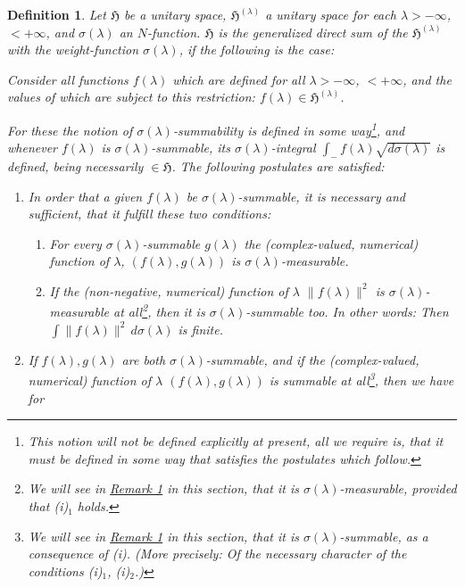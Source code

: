 \documentclass[b5paper,12pt,twoside]{article}
\numberwithin{equation}{section}
\theoremstyle{vnplain}
\theoremstyle{vndefinition}
\newtheorem{definition}{Definition}
\begin{document}
\begin{definition}\label{def:1}
Let $\mathfrak H$ be a unitary space, $\mathfrak H^{(\lambda)}$ a unitary space
for each $\lambda>-\infty$, $<+\infty$, and $\sigma(\lambda)$ an $N$-function.
$\mathfrak H$ is the \emph{generalized direct sum of the
$\mathfrak H^{(\lambda)}$ with the weight-function $\sigma(\lambda)$}, if the
following is the case:

Consider all functions $f(\lambda)$ which are defined for all
$\lambda>-\infty$, $<+\infty$, and the values of which are subject to this
restriction: $f(\lambda)\in\mathfrak H^{(\lambda)}$.

For these the notion of $\sigma(\lambda)$-summability is defined in some
way\footnote{This notion will not be defined explicitly at present, all we
require is, that it must be defined in some way that satisfies the postulates
which follow.}, and whenever $f(\lambda)$ is $\sigma(\lambda)$-summable, its
$\sigma(\lambda)$-integral
$\displaystyle\int_{-}f(\lambda)\sqrt{d\sigma(\lambda)}$ is
defined, being necessarily $\in\mathfrak H$. The following postulates are
satisfied:
\begin{enumerate}[label=(\roman*)]
\item In order that a given $f(\lambda)$ be $\sigma(\lambda)$-summable, it is
necessary and sufficient, that it fulfill these two conditions:
\begin{enumerate}[label=(i)$_{\arabic*}$]
\item For every $\sigma(\lambda)$-summable $g(\lambda)$ the (complex-valued,
numerical) function of $\lambda$, $(f(\lambda),g(\lambda))$ is
$\sigma(\lambda)$-measurable.
\item If the (non-negative, numerical) function of $\lambda$
$\lVert f(\lambda)\rVert^2$ is $\sigma(\lambda)$-measurable at
all\footnote{We will see in \hyperref[rem:3.1]{Remark 1} in this section, that it is
$\sigma(\lambda)$-measurable, provided that (i)$_1$ holds.}, then it is
$\sigma(\lambda)$-summable too. In other words: Then
$\int\lVert f(\lambda)\rVert^2\,d\sigma(\lambda)$ is finite.
\end{enumerate}
\item If $f(\lambda),g(\lambda)$ are both $\sigma(\lambda)$-summable, and if
the (complex-valued, numerical) function of $\lambda$
$(f(\lambda),g(\lambda))$ is summable at all\footnote{We will see in
\hyperref[rem:3.1]{Remark 1}
in this section, that it is $\sigma(\lambda)$-summable, as a consequence of
(i). (More precisely: Of the necessary character of the conditions
(i)$_1$, (i)$_2$.)}, then we have for

\end{enumerate}
\end{definition}
\end{document}
